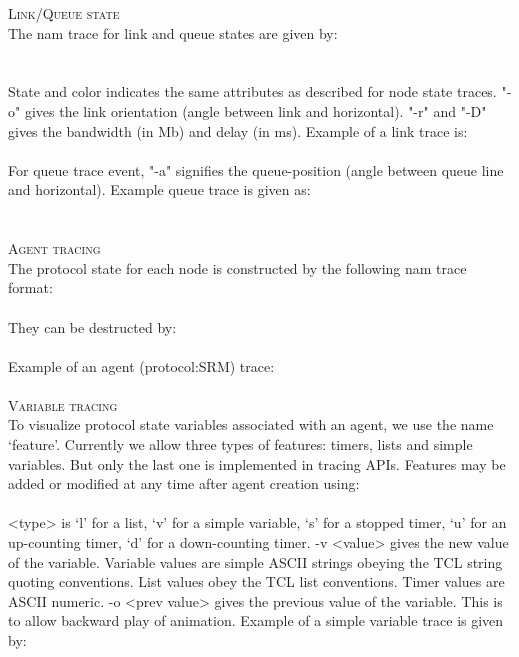 \textsc{Link/Queue state}\\
The nam trace for link and queue states are given by:\\
\\
\\
State and color indicates the same attributes as described for node state
traces. "-o" gives the link orientation (angle between link and
horizontal). "-r" and "-D" gives the bandwidth (in Mb) and delay (in ms).
Example of a link trace is:\\
\\
For queue trace event, "-a" signifies the queue-position (angle between
queue line and horizontal). Example queue trace is given as:\\
\\
\\


\textsc{Agent tracing}\\
The protocol state for each node is constructed by the following nam trace
format:\\
\\
They can be destructed by:\\
\\
Example of an agent (protocol:SRM) trace:\\
\\


\textsc{Variable tracing}\\
To visualize protocol state variables associated with an agent, we use the
name `feature'. Currently we allow three types of features: timers,
lists and simple variables. But only the last one is
implemented in \ns tracing APIs. Features may be added or modified at any
time after agent creation using:\\
\\
<type> is `l' for a list, `v' for a simple variable, `s' for a stopped
timer, `u' for an up-counting timer, `d' for a down-counting timer.
-v <value> gives the new value of the variable. Variable values are
simple ASCII strings obeying the TCL string quoting conventions.
List values obey the TCL list conventions. Timer values are ASCII
numeric. -o <prev value> gives the previous value of the variable. This is
to allow backward play of animation. Example of a simple variable trace is
given by: \\
\\

